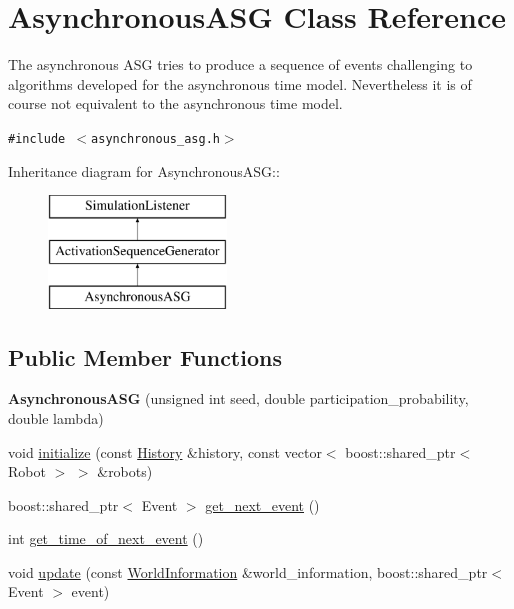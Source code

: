 \hypertarget{class_asynchronous_a_s_g}{
\section{AsynchronousASG Class Reference}
\label{class_asynchronous_a_s_g}
}
The asynchronous ASG tries to produce a sequence of events challenging to algorithms developed for the asynchronous time model. Nevertheless it is of course not equivalent to the asynchronous time model.  


{\tt \#include $<$asynchronous\_\-asg.h$>$}

Inheritance diagram for AsynchronousASG::\begin{figure}[H]
\begin{center}
\leavevmode
\includegraphics[height=3cm]{class_asynchronous_a_s_g}
\end{center}
\end{figure}
\subsection*{Public Member Functions}
\begin{CompactItemize}
\item 
\hypertarget{class_asynchronous_a_s_g_37707f45332b6e7b68f6d3c9c946cedb}{
\textbf{AsynchronousASG} (unsigned int seed, double participation\_\-probability, double lambda)}
\label{class_asynchronous_a_s_g_37707f45332b6e7b68f6d3c9c946cedb}

\item 
void \hyperlink{class_asynchronous_a_s_g_6ef9907d9f0043e45cc08a3e0d5178fa}{initialize} (const \hyperlink{class_history}{History} \&history, const vector$<$ boost::shared\_\-ptr$<$ Robot $>$ $>$ \&robots)
\item 
boost::shared\_\-ptr$<$ Event $>$ \hyperlink{class_asynchronous_a_s_g_cbec6379ed8ba4ea1351e2b1d76b9671}{get\_\-next\_\-event} ()
\item 
int \hyperlink{class_asynchronous_a_s_g_163256359314a7c69e5cfb684f311201}{get\_\-time\_\-of\_\-next\_\-event} ()
\item 
void \hyperlink{class_asynchronous_a_s_g_159110685ece0b48788dcf9d2c085010}{update} (const \hyperlink{class_world_information}{WorldInformation} \&world\_\-information, boost::shared\_\-ptr$<$ Event $>$ event)
\end{CompactItemize}
